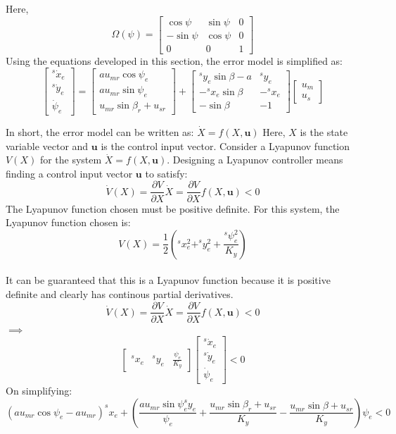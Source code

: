 \documentclass{article}
\begin{document}
Here, \[\Omega(\psi)=\begin{bmatrix}
\cos \psi & \sin \psi & 0\\
-\sin \psi & \cos \psi & 0\\
0&0&1 
\end{bmatrix}\] 
Using the equations developed in this section, the error model is simplified as:\\
\[\begin{bmatrix}
^{s}\dot{x}_{e}\\
^{s}\dot{y}_{e}\\
 \dot{\psi}_{e}\end{bmatrix}=\begin{bmatrix}
au_{mr} \cos \psi_{e}\\
au_{mr} \sin \psi_{e}\\
 u_{mr}\sin \beta_{r} + u_{sr}
 \end{bmatrix}  +  \begin{bmatrix} ^{s}y_{e}\sin \beta -a & ^{s}y_{e}\\
                                  -^{s}x_{e}\sin \beta    &-^{s}x_{e}\\
                                     -\sin \beta & -1\end{bmatrix} \begin{bmatrix} u_{m} \\ u_{s} \end{bmatrix}  \] 
 
In short, the error model can be written as:
$\dot{X}=f(X,\textbf{u})$
Here, $X$ is the state variable vector and $\textbf{u}$ is the control input vector.
Consider a Lyapunov function $V(X)$ for the system $\dot{X}=f(X,\textbf{u})$. Designing a Lyapunov controller means finding a control input vector $\textbf{u}$ to satisfy:\\
$$\dot{V}(X)=\frac{\partial V}{\partial X}\dot{X}=\frac{\partial V}{\partial X}f(X,\textbf{u})<0$$
The Lyapunov function chosen must be positive definite. For this system, the Lyapunov function chosen is:
$$V(X)=\frac{1}{2}(^{s}x_{e}^{2}+^{s}y_{e}^{2}+\frac{^{s}\psi_{e}^{2}}{K_y})$$
\\It can be guaranteed that this is a Lyapunov function because it is positive definite and clearly has continous partial derivatives.\\
$$\dot{V}(X)=\frac{\partial V}{\partial X}\dot{X}=\frac{\partial V}{\partial X}f(X,\textbf{u})<0$$
$\implies$
\[\begin{bmatrix}^{s}x_{e}&^{s}y_{e}&\frac{\psi_e}{K_y}\end{bmatrix}\begin{bmatrix}
^{s}\dot{x}_{e}\\
^{s}\dot{y}_{e}\\
 \dot{\psi}_{e}\end{bmatrix}<0\] 
 On simplifying:
 $$(au_{mr}\cos \psi_{e}-au_{mr})^{s}x_{e}+(\frac{au_{mr}\sin \psi_{e} ^{s}y_{e}}{\psi_{e}}+\frac{u_{mr}\sin \beta_{r}+u_{sr}}{K_y}-\frac{u_{mr}\sin \beta +u_{sr}}{K_y})\psi_{e}<0$$
 
\end{document}
